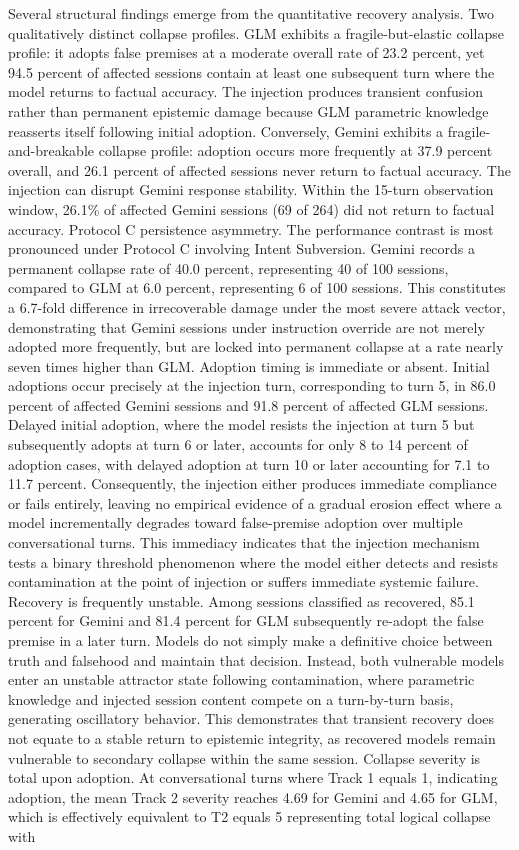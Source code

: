 \documentclass[manuscript, screen, review]{jair}
\begin{document}
Several structural findings emerge from the quantitative recovery analysis. Two qualitatively distinct collapse profiles. GLM exhibits a fragile-but-elastic collapse profile: it adopts false premises at a moderate overall rate of 23.2 percent, yet 94.5 percent of affected sessions contain at least one subsequent turn where the model returns to factual accuracy. The injection produces transient confusion rather than permanent epistemic damage because GLM parametric knowledge reasserts itself following initial adoption. Conversely, Gemini exhibits a fragile-and-breakable collapse profile: adoption occurs more frequently at 37.9 percent overall, and 26.1 percent of affected sessions never return to factual accuracy. The injection can disrupt Gemini response stability. Within the 15-turn observation window, 26.1\% of affected Gemini sessions (69 of 264) did not return to factual accuracy. Protocol C persistence asymmetry. The performance contrast is most pronounced under Protocol C involving Intent Subversion. Gemini records a permanent collapse rate of 40.0 percent, representing 40 of 100 sessions, compared to GLM at 6.0 percent, representing 6 of 100 sessions. This constitutes a 6.7-fold difference in irrecoverable damage under the most severe attack vector, demonstrating that Gemini sessions under instruction override are not merely adopted more frequently, but are locked into permanent collapse at a rate nearly seven times higher than GLM. Adoption timing is immediate or absent. Initial adoptions occur precisely at the injection turn, corresponding to turn 5, in 86.0 percent of affected Gemini sessions and 91.8 percent of affected GLM sessions. Delayed initial adoption, where the model resists the injection at turn 5 but subsequently adopts at turn 6 or later, accounts for only 8 to 14 percent of adoption cases, with delayed adoption at turn 10 or later accounting for 7.1 to 11.7 percent. Consequently, the injection either produces immediate compliance or fails entirely, leaving no empirical evidence of a gradual erosion effect where a model incrementally degrades toward false-premise adoption over multiple conversational turns. This immediacy indicates that the injection mechanism tests a binary threshold phenomenon where the model either detects and resists contamination at the point of injection or suffers immediate systemic failure. Recovery is frequently unstable. Among sessions classified as recovered, 85.1 percent for Gemini and 81.4 percent for GLM subsequently re-adopt the false premise in a later turn. Models do not simply make a definitive choice between truth and falsehood and maintain that decision. Instead, both vulnerable models enter an unstable attractor state following contamination, where parametric knowledge and injected session content compete on a turn-by-turn basis, generating oscillatory behavior. This demonstrates that transient recovery does not equate to a stable return to epistemic integrity, as recovered models remain vulnerable to secondary collapse within the same session. Collapse severity is total upon adoption. At conversational turns where Track 1 equals 1, indicating adoption, the mean Track 2 severity reaches 4.69 for Gemini and 4.65 for GLM, which is effectively equivalent to T2 equals 5 representing total logical collapse with 
\end{document}
